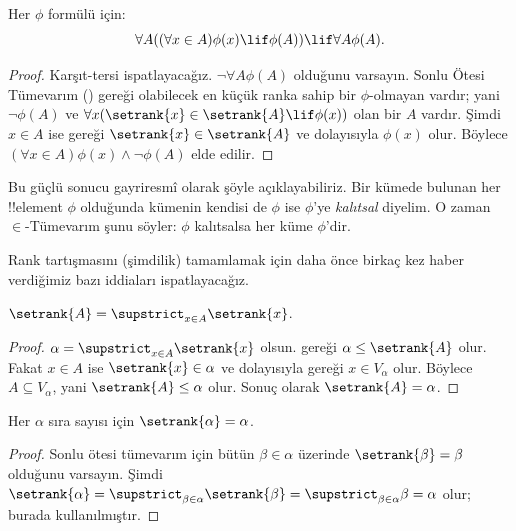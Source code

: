\begin{thm}
Her $\phi$ formülü için:
\[
	\forall A((\forall x \in A)\phi(x) \lif \phi(A)) \lif \forall A \phi(A).
\]
\end{thm}

\begin{proof}
Karşıt-tersi ispatlayacağız. $\lnot\forall A\phi(A)$ olduğunu varsayın.
Sonlu Ötesi Tümevarım
() gereği olabilecek en küçük
ranka sahip bir $\phi$-olmayan vardır; yani $\lnot\phi(A)$ ve
$\forall x(\setrank{x}\in\setrank{A}\lif\phi(x))$ olan bir $A$ vardır.
Şimdi $x\in A$ ise  gereği
$\setrank{x}\in\setrank{A}$ ve dolayısıyla $\phi(x)$ olur. Böylece
$(\forall x\in A)\phi(x)\land\lnot\phi(A)$ elde edilir.
\end{proof}\noindent
Bu güçlü sonucu gayriresmî olarak şöyle açıklayabiliriz. Bir kümede bulunan
her !!{element} $\phi$ olduğunda kümenin kendisi de $\phi$ ise $\phi$'ye
\emph{kalıtsal} diyelim. O zaman $\in$-Tümevarım şunu söyler: $\phi$
kalıtsalsa her küme $\phi$'dir.

Rank tartışmasını (şimdilik) tamamlamak için daha önce birkaç kez haber
verdiğimiz bazı iddiaları ispatlayacağız.

\begin{prop}
$\setrank{A} = \supstrict_{x \in A}\setrank{x}$.
\end{prop}

\begin{proof}
$\alpha=\supstrict_{x\in A}\setrank{x}$ olsun.
 gereği $\alpha\leq\setrank{A}$ olur. Fakat
$x\in A$ ise $\setrank{x}\in\alpha$ ve dolayısıyla
 gereği $x\in V_\alpha$ olur. Böylece
$A\subseteq V_\alpha$, yani $\setrank{A}\leq\alpha$ olur. Sonuç olarak
$\setrank{A}=\alpha$.
\end{proof}

\begin{cor}
Her $\alpha$ sıra sayısı için $\setrank{\alpha}=\alpha$.
\end{cor}

\begin{proof}
Sonlu ötesi tümevarım için bütün $\beta\in\alpha$ üzerinde
$\setrank{\beta}=\beta$ olduğunu varsayın. Şimdi
$\setrank{\alpha}=\supstrict_{\beta\in\alpha}\setrank{\beta}=
\supstrict_{\beta\in\alpha}\beta=\alpha$ olur; burada
 kullanılmıştır.
%
\end{proof}

